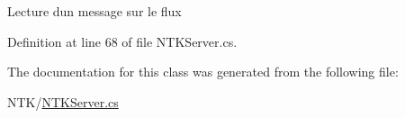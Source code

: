 Lecture d\textquotesingle{}un message sur le flux 



Definition at line 68 of file N\+T\+K\+Server.\+cs.



The documentation for this class was generated from the following file\+:\begin{DoxyCompactItemize}
\item 
N\+T\+K/\mbox{\hyperlink{_n_t_k_server_8cs}{N\+T\+K\+Server.\+cs}}\end{DoxyCompactItemize}
